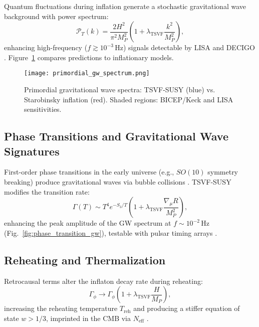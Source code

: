 \documentclass[twocolumn,superscriptaddress,floatfix]{revtex4-2}
\begin{document}
Quantum fluctuations during inflation generate a stochastic gravitational wave background with power spectrum:  
\begin{equation}  
\mathcal{P}_T(k) = \frac{2H^2}{\pi^2 M_P^2} \left(1 + \lambda_{\text{TSVF}} \frac{k^2}{M_P^2}\right),  
\label{eq:gw_power}  
\end{equation}  
enhancing high-frequency (\(f \gtrsim 10^{-3} \, \text{Hz}\)) signals detectable by LISA \cite{Amaro-Seoane2017} and DECIGO \cite{Kawamura2020}. Figure~\ref{fig:primordial_gw} compares predictions to inflationary models.  

\begin{figure}[htbp]  
\centering  
\texttt{[image: primordial\_gw\_spectrum.png]}  
\caption{Primordial gravitational wave spectra: TSVF-SUSY (blue) vs. Starobinsky inflation (red). Shaded regions: BICEP/Keck \cite{BICEP2021} and LISA sensitivities.}  
\label{fig:primordial_gw}  
\end{figure}  

\subsection{Phase Transitions and Gravitational Wave Signatures}  
\label{subsec:phase_transitions}  

First-order phase transitions in the early universe (e.g., \(SO(10)\) symmetry breaking) produce gravitational waves via bubble collisions \cite{Kosowsky1992}. TSVF-SUSY modifies the transition rate:  
\begin{equation}  
\Gamma(T) \sim T^4 e^{-S_3/T} \left(1 + \lambda_{\text{TSVF}} \frac{\nabla_\mu R}{M_P^2}\right),  
\label{eq:phase_transition}  
\end{equation}  
enhancing the peak amplitude of the GW spectrum at \(f \sim 10^{-2} \, \text{Hz}\) (Fig.~\ref{fig:phase_transition_gw}), testable with pulsar timing arrays \cite{IPTA2021}.  

\subsection{Reheating and Thermalization}  
\label{subsec:reheating}  

Retrocausal terms alter the inflaton decay rate during reheating:  
\begin{equation}  
\Gamma_\phi \to \Gamma_\phi \left(1 + \lambda_{\text{TSVF}} \frac{H}{M_P}\right),  
\label{eq:reheating}  
\end{equation}  
increasing the reheating temperature \(T_{\text{reh}}\) and producing a stiffer equation of state \(w > 1/3\), imprinted in the CMB via \(N_{\text{eff}}\) \cite{Planck2018}.  
\end{document}
